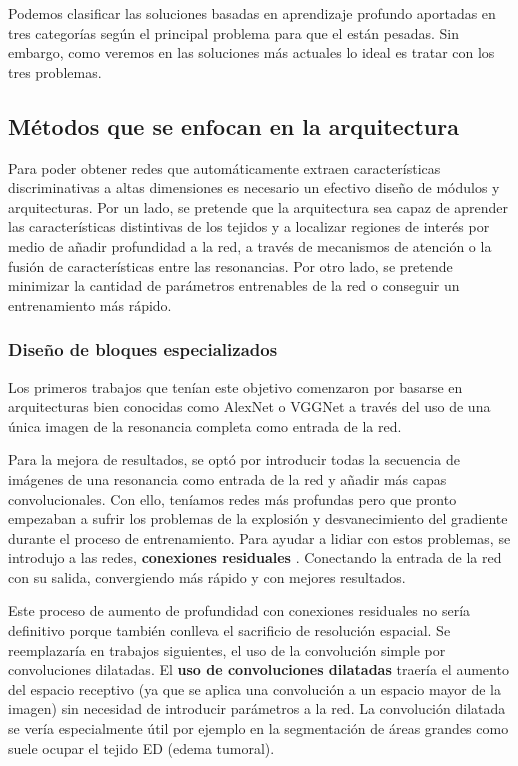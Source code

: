 	Podemos clasificar las soluciones basadas en aprendizaje profundo aportadas en tres categorías según el principal problema para que el están pesadas. Sin embargo, como veremos en las soluciones más actuales lo ideal es tratar con los tres problemas.
	
	\subsection{Métodos que se enfocan en la arquitectura}
		
		 Para poder obtener redes que automáticamente extraen características discriminativas a altas dimensiones es necesario un efectivo diseño de módulos y arquitecturas. Por un lado, se pretende que la arquitectura sea capaz de aprender las características distintivas de los tejidos y a localizar regiones de interés por medio de añadir profundidad a la red, a través de mecanismos de atención o la fusión de características entre las resonancias. Por otro lado, se pretende minimizar la cantidad de parámetros entrenables de la red o conseguir un entrenamiento más rápido.
		 
		\subsubsection{Diseño de bloques especializados}
			
			Los primeros trabajos que tenían este objetivo comenzaron por basarse en arquitecturas bien conocidas como AlexNet o VGGNet a través del uso de una única imagen de la resonancia completa como entrada de la red.
			
			Para la mejora de resultados, se optó por introducir todas la secuencia de imágenes de una resonancia como entrada de la red y añadir más capas convolucionales. Con ello, teníamos redes más profundas pero que pronto empezaban a sufrir los problemas de la explosión y desvanecimiento del gradiente durante el proceso de entrenamiento. Para ayudar a lidiar con estos problemas, se introdujo a las redes, \textbf{conexiones residuales} \cite{chang2016fully}. Conectando la entrada de la red con su salida, convergiendo más rápido y con mejores resultados. 
			
			Este proceso de aumento de profundidad con conexiones residuales no sería definitivo porque también conlleva el sacrificio de resolución espacial. Se reemplazaría en trabajos siguientes, el uso de la convolución simple por convoluciones dilatadas. El \textbf{uso de convoluciones dilatadas} traería el aumento del espacio receptivo (ya que se aplica una convolución a un espacio mayor de la imagen) sin necesidad de introducir parámetros a la red. La convolución dilatada se vería especialmente útil por ejemplo en la segmentación de áreas grandes como suele ocupar el tejido ED (edema tumoral). 
			
